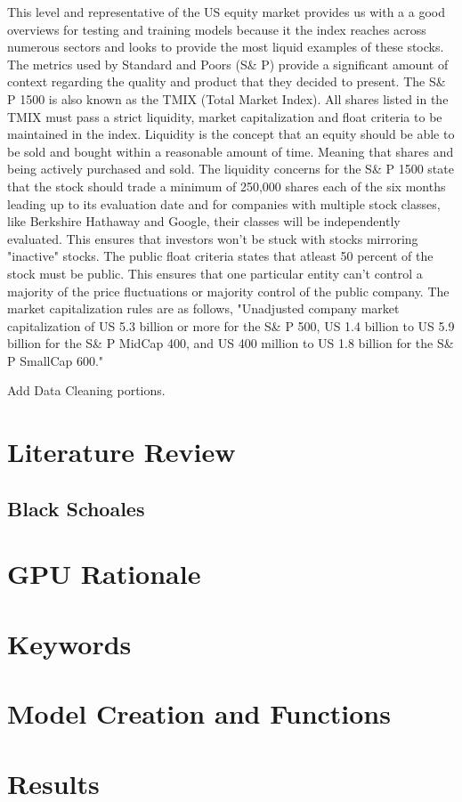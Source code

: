 \documentclass[paper=letter, fontsize=11pt]{scrartcl}
\numberwithin{equation}{section}		%
\numberwithin{figure}{section}			%
\numberwithin{table}{section}				%
\begin{document}
\begin{spacing}{2}
This level and representative of the US equity market provides us with a a good overviews for testing and training models because it the index reaches across numerous sectors and looks to provide the most liquid examples of these stocks. The metrics used by Standard and Poors (S\& P) provide a significant amount of context regarding the quality and product that they decided to present. The S\& P 1500 is also known as the TMIX (Total Market Index). All shares listed in the TMIX must pass a strict liquidity, market capitalization and float criteria to be maintained in the index. Liquidity is the concept that an equity should be able to be sold and bought within a reasonable amount of time. Meaning that shares and being actively purchased and sold. The liquidity concerns for the S\& P 1500 state that the stock should trade a minimum of 250,000 shares each of the six months leading up to its evaluation date and for companies with multiple stock classes, like Berkshire Hathaway and Google, their classes will be independently evaluated. This ensures that investors won't be stuck with stocks mirroring "inactive" stocks. The public float criteria states that atleast 50 percent of the stock must be public. This ensures that one particular entity can't control a majority of the price fluctuations or majority control of the public company. The market capitalization rules are as follows, "Unadjusted company market capitalization of US 5.3 billion or more for the S\& P 500, US 1.4 billion to US 5.9 billion for the  S\& P MidCap 400, and US 400 million to US 1.8 billion for the S\& P SmallCap 600." \cite{Methodology}

Add Data Cleaning portions. 

\section{Literature Review}
\subsection{Black Schoales}
\section{GPU Rationale}
\section{Keywords}
\section{Model Creation and Functions}
\section{Results}





\end{spacing}

 
\end{document}
